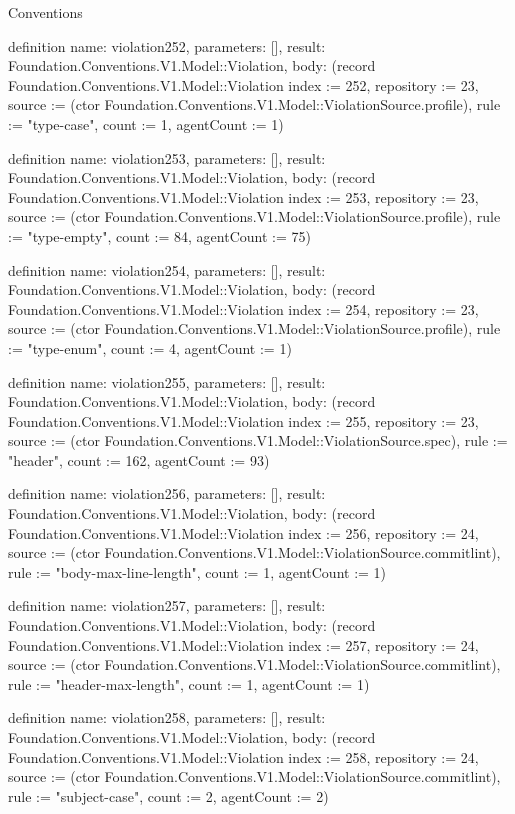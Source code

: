 \begin{lexlean}{Conventions}
\begin{semanticmodule}
definition{
  name: violation252,
  parameters: [],
  result: Foundation.Conventions.V1.Model::Violation,
  body: (record Foundation.Conventions.V1.Model::Violation {index := 252, repository := 23, source := (ctor Foundation.Conventions.V1.Model::ViolationSource.profile), rule := "type-case", count := 1, agentCount := 1})
}

definition{
  name: violation253,
  parameters: [],
  result: Foundation.Conventions.V1.Model::Violation,
  body: (record Foundation.Conventions.V1.Model::Violation {index := 253, repository := 23, source := (ctor Foundation.Conventions.V1.Model::ViolationSource.profile), rule := "type-empty", count := 84, agentCount := 75})
}

definition{
  name: violation254,
  parameters: [],
  result: Foundation.Conventions.V1.Model::Violation,
  body: (record Foundation.Conventions.V1.Model::Violation {index := 254, repository := 23, source := (ctor Foundation.Conventions.V1.Model::ViolationSource.profile), rule := "type-enum", count := 4, agentCount := 1})
}

definition{
  name: violation255,
  parameters: [],
  result: Foundation.Conventions.V1.Model::Violation,
  body: (record Foundation.Conventions.V1.Model::Violation {index := 255, repository := 23, source := (ctor Foundation.Conventions.V1.Model::ViolationSource.spec), rule := "header", count := 162, agentCount := 93})
}

definition{
  name: violation256,
  parameters: [],
  result: Foundation.Conventions.V1.Model::Violation,
  body: (record Foundation.Conventions.V1.Model::Violation {index := 256, repository := 24, source := (ctor Foundation.Conventions.V1.Model::ViolationSource.commitlint), rule := "body-max-line-length", count := 1, agentCount := 1})
}

definition{
  name: violation257,
  parameters: [],
  result: Foundation.Conventions.V1.Model::Violation,
  body: (record Foundation.Conventions.V1.Model::Violation {index := 257, repository := 24, source := (ctor Foundation.Conventions.V1.Model::ViolationSource.commitlint), rule := "header-max-length", count := 1, agentCount := 1})
}

definition{
  name: violation258,
  parameters: [],
  result: Foundation.Conventions.V1.Model::Violation,
  body: (record Foundation.Conventions.V1.Model::Violation {index := 258, repository := 24, source := (ctor Foundation.Conventions.V1.Model::ViolationSource.commitlint), rule := "subject-case", count := 2, agentCount := 2})
}


\end{semanticmodule}
\end{lexlean}
